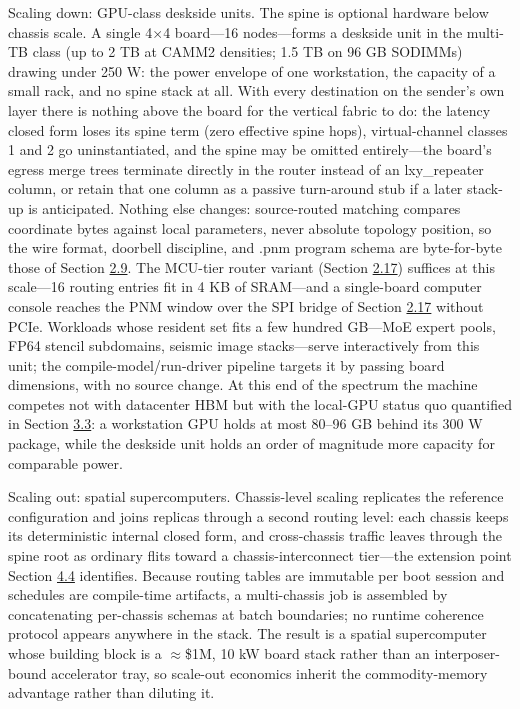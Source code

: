 \documentclass[10pt,twocolumn]{article}
\begin{document}
Scaling down: GPU-class deskside units. The spine is optional hardware below chassis scale. A single 4$\times$4 board---16 nodes---forms a deskside unit in the multi-TB class (up to 2 TB at CAMM2 densities; 1.5 TB on 96 GB SODIMMs) drawing under 250 W: the power envelope of one workstation, the capacity of a small rack, and no spine stack at all. With every destination on the sender's own layer there is nothing above the board for the vertical fabric to do: the latency closed form loses its spine term (zero effective spine hops), virtual-channel classes 1 and 2 go uninstantiated, and the spine may be omitted entirely---the board's egress merge trees terminate directly in the router instead of an lxy\_repeater column, or retain that one column as a passive turn-around stub if a later stack-up is anticipated. Nothing else changes: source-routed matching compares coordinate bytes against local parameters, never absolute topology position, so the wire format, doorbell discipline, and .pnm program schema are byte-for-byte those of Section \hyperref[sec:2.9]{2.9}. The MCU-tier router variant (Section \hyperref[sec:2.17]{2.17}) suffices at this scale---16 routing entries fit in 4 KB of SRAM---and a single-board computer console reaches the PNM window over the SPI bridge of Section \hyperref[sec:2.17]{2.17} without PCIe. Workloads whose resident set fits a few hundred GB---MoE expert pools, FP64 stencil subdomains, seismic image stacks---serve interactively from this unit; the compile-model/run-driver pipeline targets it by passing board dimensions, with no source change. At this end of the spectrum the machine competes not with datacenter HBM but with the local-GPU status quo quantified in Section \hyperref[sec:3.3]{3.3}: a workstation GPU holds at most 80--96 GB behind its 300 W package, while the deskside unit holds an order of magnitude more capacity for comparable power.

Scaling out: spatial supercomputers. Chassis-level scaling replicates the reference configuration and joins replicas through a second routing level: each chassis keeps its deterministic internal closed form, and cross-chassis traffic leaves through the spine root as ordinary flits toward a chassis-interconnect tier---the extension point Section \hyperref[sec:4.4]{4.4} identifies. Because routing tables are immutable per boot session and schedules are compile-time artifacts, a multi-chassis job is assembled by concatenating per-chassis schemas at batch boundaries; no runtime coherence protocol appears anywhere in the stack. The result is a spatial supercomputer whose building block is a $\approx$\$1M, 10 kW board stack rather than an interposer-bound accelerator tray, so scale-out economics inherit the commodity-memory advantage rather than diluting it.
\end{document}
